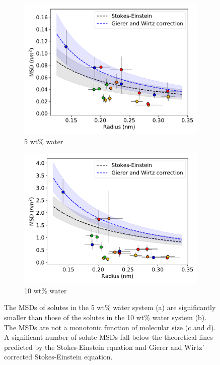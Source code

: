 \documentclass[journal=jpcbfk,manuscript=article]{achemso}
\begin{document}
\begin{figure}[!htb]
\begin{subfigure}{0.45\textwidth}
  \includegraphics[width=\textwidth]{msd_radius_5wt.pdf} 
  \caption{5 wt\% water}\label{fig:msd_radius_5wt}
  \end{subfigure}
  \begin{subfigure}{0.45\textwidth}
  \includegraphics[width=\textwidth]{msd_radius_10wt.pdf} 
  \caption{10 wt\% water}\label{fig:msd_radius_10wt}
  \end{subfigure}

  \caption{The MSDs of solutes in the 5 wt\% water system (a) are significantly
  smaller than those of the solutes in the 10 wt\% water system (b). The
  MSDs are not a monotonic function of molecular size (c and d). A significant
  number of solute MSDs fall below the theoretical lines predicted by the 
  Stokes-Einstein equation and Gierer and Wirtz' corrected Stokes-Einstein equation.
  }\label{fig:msds}
  \end{figure}
    
\end{document}
